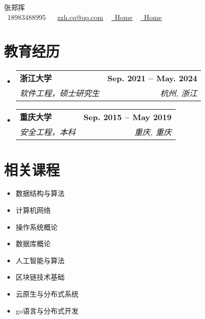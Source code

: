 \documentclass[letterpaper,11pt]{ctexart}
\makeatletter
\newcommand{\resumeSubheading}[4]{
  \vspace{-2pt}\item
    \begin{tabular*}{1.0\textwidth}[t]{l@{\extracolsep{\fill}}r}
      \textbf{#1} & \textbf{\small #2} \\
      \textit{\small#3} & \textit{\small #4} \\
    \end{tabular*}\vspace{-7pt}
}
\newcommand{\resumeSubHeadingListStart}{\begin{itemize}[leftmargin=0.0in, label={}]}
\newcommand{\resumeSubHeadingListEnd}{\end{itemize}}
\makeatother
\begin{document}

\begin{center}
    {\Huge \scshape 张郑挥} \\ \vspace{1pt}
    \vspace{1pt}
    \small \raisebox{-0.1\height}\faPhone\ 18983488995 ~ \raisebox{-0.2\height}\faEnvelope\  \underline{zzh.cq@qq.com} ~
    \href{https://linkedin.com/in/kevin-zhang-95245521b/}{\raisebox{-0.2\height}\faLinkedin\ \underline{Home}}  ~
    \href{https://github.com/kevin-zhangzh}{\raisebox{-0.2\height}\faGithub\ \underline{Home}}
    \vspace{-8pt}
\end{center}


\section{教育经历}
  \resumeSubHeadingListStart
    \resumeSubheading
      {浙江大学}{Sep. 2021 -- May. 2024}
      {软件工程，硕士研究生}{杭州, 浙江}
    \resumeSubheading
      {重庆大学}{Sep. 2015 -- May 2019}
      {安全工程，本科}{重庆, 重庆}
  \resumeSubHeadingListEnd

\section{相关课程}
       \begin{multicols}{4}
           \begin{itemize}[itemsep=-5pt, parsep=3pt]
               \item 数据结构与算法
               \item 计算机网络
               \item 操作系统概论
               \item 数据库概论
               \item 人工智能与算法
               \item 区块链技术基础
               \item 云原生与分布式系统
               \item go语言与分布式开发
           \end{itemize}
       \end{multicols}
       \vspace*{2.0\multicolsep}
\end{document}
